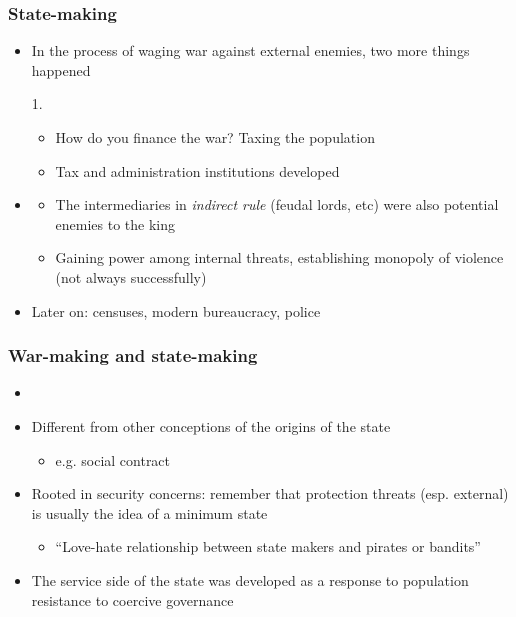 \documentclass[aspectratio=43]{beamer}
\begin{document}
\begin{frame}
\frametitle{State-making}
\centering

\begin{itemize}
\item In the process of waging war against external enemies, two more things happened
\item[1.] 
  \begin{itemize}
    \item How do you finance the war? Taxing the population
    \item Tax and administration institutions developed
  \end{itemize}
\item<2->[2.] 
\begin{itemize}
  \item The intermediaries in \textit{indirect rule} (feudal lords, etc) were also potential enemies to the king
  \item Gaining power among internal threats, establishing monopoly of violence (not always successfully)
\end{itemize}
\item<3-> Later on: censuses, modern bureaucracy, police
\end{itemize}

\end{frame}

\begin{frame}
\frametitle{War-making and state-making}
\centering

\begin{itemize}
\item {}
\item[]
\item<2-> Different from other conceptions of the origins of the state
\begin{itemize}
  \item e.g. social contract
\end{itemize}
\item<2-> Rooted in security concerns: remember that protection threats (esp. external) is usually the idea of a minimum state
\begin{itemize}
  \item ``Love-hate relationship between state makers and pirates or bandits''
\end{itemize}
\item<2-> The service side of the state was developed as a response to population resistance to coercive governance
\end{itemize}

\end{frame}
\end{document}
